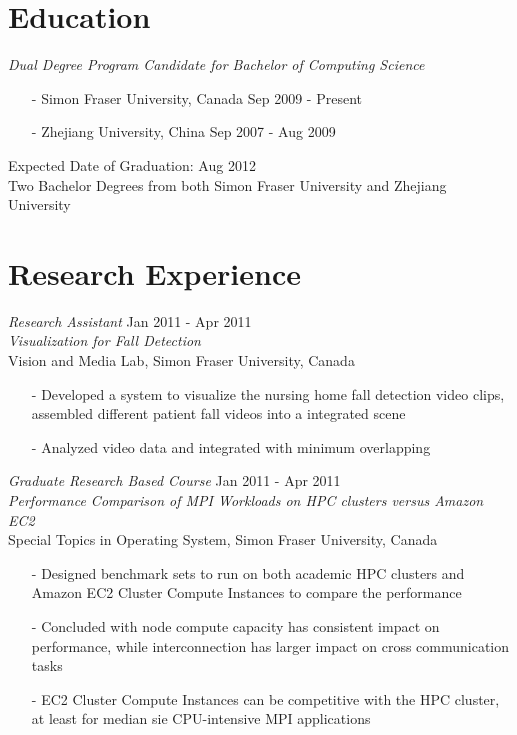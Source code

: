 \documentclass[line,margin]{res}
\begin{document}
\address{7309 Montclair, Burnaby, BC, Canada V5A 3J2}
\address{+1-778-881-3070 \\jias@sfu.ca}

\begin{resume}

\section{Education} 
    {\sl Dual Degree Program Candidate for Bachelor of Computing Science}  
      \begin{itemize} \itemsep -2pt
        \item[-] Simon Fraser University, Canada \hfill Sep 2009 - Present
        \item[-] Zhejiang University, China \hfill Sep 2007 - Aug 2009
      \end{itemize}
	  \vspace{-1.1em}
      Expected Date of Graduation: Aug 2012 \\
      Two Bachelor Degrees from both Simon Fraser University and Zhejiang University

\section{Research Experience}
    {\sl Research Assistant} \hfill Jan 2011 - Apr 2011 \\
	{\sl Visualization for Fall Detection}\\
	Vision and Media Lab, Simon Fraser University, Canada
	\begin{itemize} \itemsep -2pt
	    \item[-] Developed a system to visualize the nursing home fall detection video clips, assembled different patient fall videos into a integrated scene
		\item[-] Analyzed video data and integrated with minimum overlapping
	\end{itemize}

	{\sl Graduate Research Based Course} \hfill Jan 2011 - Apr 2011 \\
	{\sl Performance Comparison of MPI Workloads on HPC clusters versus Amazon EC2} \\
	Special Topics in Operating System, Simon Fraser University, Canada
	\begin{itemize} \itemsep -2pt
	    \item[-] Designed benchmark sets to run on both academic HPC clusters and Amazon EC2 Cluster Compute Instances to compare the performance
		\item[-] Concluded with node compute capacity has consistent impact on performance, while interconnection has larger impact on cross communication tasks
		\item[-] EC2 Cluster Compute Instances can be competitive with the HPC cluster, at least for median sie CPU-intensive MPI applications
	\end{itemize}


\end{resume}
\end{document}
